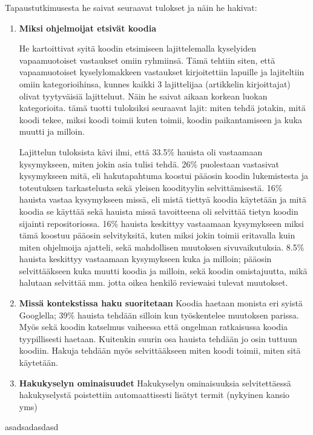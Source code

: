 \documentclass[finnish]{../tktltiki2}
\theoremstyle{definition}
\theoremstyle{remark}
\begin{document}
Tapaustutkimusesta he saivat seuraavat tulokset ja näin he hakivat:
\begin{enumerate}

  \item {\bf Miksi ohjelmoijat etsivät koodia}

    He kartoittivat syitä koodin etsimiseen lajittelemalla kyselyiden vapaamuotoiset vastaukset omiin ryhmiinsä. Tämä tehtiin siten, että vapaamuotoiset kyselylomakkeen vastaukset kirjoitettiin lapuille ja lajiteltiin omiin kategorioihinsa, kunnes kaikki 3 lajittelijaa (artikkelin kirjoittajat) olivat tyytyväisiä lajitteluut. Näin he saivat aikaan korkean luokan kategorioita.
    tämä tuotti tuloksiksi seuraavat lajit: miten tehdä jotakin, mitä koodi tekee, miksi koodi toimii kuten toimii, koodin paikantamiseen ja kuka muutti ja milloin.

  Lajittelun tuloksista kävi ilmi, että 33.5\% hauista oli vastaamaan kysymykseen, miten jokin asia tulisi tehdä. 26\% puolestaan vastasivat kysymykseen mitä, eli hakutapahtuma koostui pääosin koodin lukemistesta ja toteutuksen tarkastelusta sekä yleisen koodityylin selvittämisestä. 16\% hauista vastaa kysymykseen missä, eli mistä tiettyä koodia käytetään ja mitä koodia se käyttää sekä hauista missä tavoitteena oli selvittää tietyn koodin sijainti repositoriossa. 16\% hauista keskittyy vastaamaan kysymykseen miksi tämä koostuu pääosin selvityksitä, kuten miksi jokin toimii eritavalla kuin miten ohjelmoija ajatteli, sekä mahdollisen muutoksen sivuvaikutuksia. 8.5\% hauista keskittyy vastaamaan kysymykseen kuka ja milloin; pääosin selvittääkseen kuka muutti koodia ja milloin, sekä koodin omistajuutta, mikä halutaan selvittää mm. jotta oikea henkilö reviewaisi tulevat muutokset.

  \item {\bf Missä kontekstissa haku suoritetaan}
    Koodia haetaan monista eri syistä Googlella; 39\% hauista tehdään silloin kun työskentelee muutoksen parissa. Myös sekä koodin katselmus vaiheessa että ongelman ratkaisussa koodia tyypillisesti haetaan. Kuitenkin suurin osa hauista tehdään jo osin tuttuun koodiin. Hakuja tehdään myös selvittääkseen miten koodi toimii, miten sitä käytetään.

  \item {\bf Hakukyselyn ominaisuudet}
    Hakukyselyn ominaisuuksia selvitettäessä hakukyselystä poistettiin automaattisesti lisätyt termit (nykyinen kansio yms)

\end{enumerate}
asadsadasdasd
\end{document}
